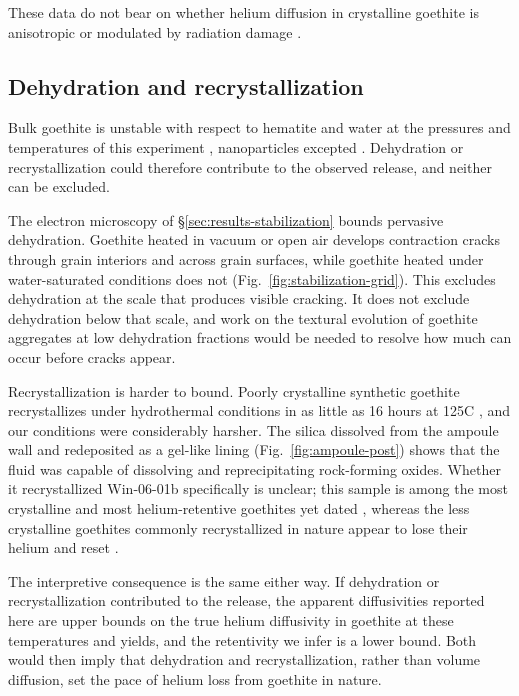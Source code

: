 These data do not bear on whether helium diffusion in crystalline goethite is anisotropic or modulated by radiation damage \citep{bassal2022}.

\subsection{Dehydration and recrystallization}\label{sec:discussion-alteration}

Bulk goethite is unstable with respect to hematite and water at the pressures and temperatures of this experiment \citep{majzlan2003}, nanoparticles excepted \citep{guobarnard2011,navrotsky2008}. Dehydration or recrystallization could therefore contribute to the observed release, and neither can be excluded.

The electron microscopy of \S\ref{sec:results-stabilization} bounds pervasive dehydration. Goethite heated in vacuum or open air develops contraction cracks through grain interiors and across grain surfaces, while goethite heated under water-saturated conditions does not (Fig.~\ref{fig:stabilization-grid}). This excludes dehydration at the scale that produces visible cracking. It does not exclude dehydration below that scale, and work on the textural evolution of goethite aggregates at low dehydration fractions would be needed to resolve how much can occur before cracks appear.

Recrystallization is harder to bound. Poorly crystalline synthetic goethite recrystallizes under hydrothermal conditions in as little as 16 hours at 125\textdegree C \citep{schwertmann1985}, and our conditions were considerably harsher. The silica dissolved from the ampoule wall and redeposited as a gel-like lining (Fig.~\ref{fig:ampoule-post}) shows that the fluid was capable of dissolving and reprecipitating rock-forming oxides. Whether it recrystallized Win-06-01b specifically is unclear; this sample is among the most crystalline and most helium-retentive goethites yet dated \citep{waltenberg2012,farley2024}, whereas the less crystalline goethites commonly recrystallized in nature appear to lose their helium and reset \citep{monteiro2018,monteiro2014,heim2006}.

The interpretive consequence is the same either way. If dehydration or recrystallization contributed to the release, the apparent diffusivities reported here are upper bounds on the true helium diffusivity in goethite at these temperatures and yields, and the retentivity we infer is a lower bound. Both would then imply that dehydration and recrystallization, rather than volume diffusion, set the pace of helium loss from goethite in nature.

